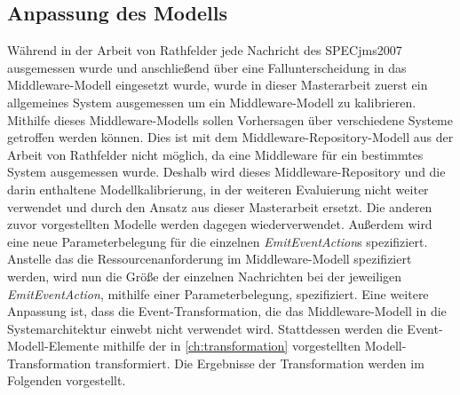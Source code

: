 \subsection{Anpassung des Modells}
Während in der Arbeit von Rathfelder jede Nachricht des SPECjms2007 ausgemessen wurde und anschließend über eine Fallunterscheidung in das Middleware-Modell eingesetzt wurde, wurde in dieser Masterarbeit zuerst ein allgemeines System ausgemessen um ein Middleware-Modell zu kalibrieren. Mithilfe dieses Middleware-Modells sollen Vorhersagen über verschiedene Systeme getroffen werden können. Dies ist mit dem Middleware-Repository-Modell aus der Arbeit von Rathfelder nicht möglich, da eine Middleware für ein bestimmtes System ausgemessen wurde. Deshalb wird dieses Middleware-Repository und die darin enthaltene Modellkalibrierung, in der weiteren Evaluierung nicht weiter verwendet und durch den Ansatz aus dieser Masterarbeit ersetzt. 
Die anderen zuvor vorgestellten Modelle werden dagegen wiederverwendet. Außerdem wird eine neue Parameterbelegung für die einzelnen \emph{EmitEventAction}s spezifiziert. Anstelle das die Ressourcenanforderung im Middleware-Modell spezifiziert werden, wird nun die Größe der einzelnen Nachrichten bei der jeweiligen \emph{EmitEventAction}, mithilfe einer Parameterbelegung, spezifiziert. Eine weitere Anpassung ist, dass die Event-Transformation, die das Middleware-Modell in die Systemarchitektur einwebt nicht verwendet wird. Stattdessen werden die Event-Modell-Elemente mithilfe der in \autoref{ch:transformation} vorgestellten Modell-Transformation transformiert. Die Ergebnisse der Transformation werden im Folgenden vorgestellt.





